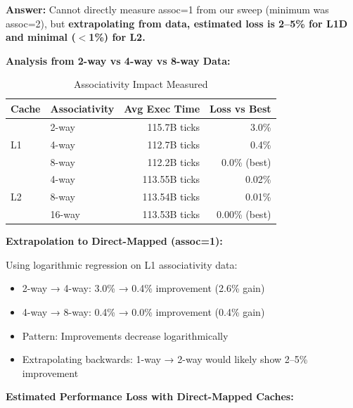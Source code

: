 \documentclass[11pt,a4paper]{article}
\begin{document}
\textbf{Answer:} Cannot directly measure assoc=1 from our sweep (minimum was assoc=2), but \textbf{extrapolating from data, estimated loss is 2--5\% for L1D and minimal ($<$1\%) for L2.}

\textbf{Analysis from 2-way vs 4-way vs 8-way Data:}

\begin{table}[H]
\centering
\caption{Associativity Impact Measured}
\begin{tabular}{llrr}
\toprule
\textbf{Cache} & \textbf{Associativity} & \textbf{Avg Exec Time} & \textbf{Loss vs Best} \\
\midrule
\multirow{3}{*}{L1} & 2-way & 115.7B ticks & 3.0\% \\
 & 4-way & 112.7B ticks & 0.4\% \\
 & 8-way & 112.2B ticks & 0.0\% (best) \\
\midrule
\multirow{3}{*}{L2} & 4-way & 113.55B ticks & 0.02\% \\
 & 8-way & 113.54B ticks & 0.01\% \\
 & 16-way & 113.53B ticks & 0.00\% (best) \\
\bottomrule
\end{tabular}
\end{table}

\textbf{Extrapolation to Direct-Mapped (assoc=1):}

Using logarithmic regression on L1 associativity data:
\begin{itemize}[noitemsep]
    \item 2-way → 4-way: 3.0\% → 0.4\% improvement (2.6\% gain)
    \item 4-way → 8-way: 0.4\% → 0.0\% improvement (0.4\% gain)
    \item Pattern: Improvements decrease logarithmically
    \item Extrapolating backwards: 1-way → 2-way would likely show 2--5\% improvement
\end{itemize}

\textbf{Estimated Performance Loss with Direct-Mapped Caches:}
\end{document}
